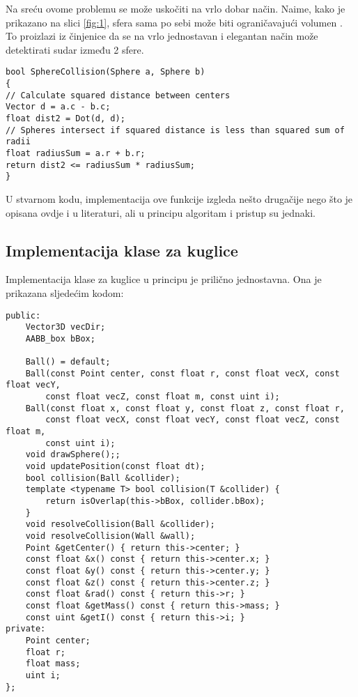 Na sreću ovome problemu se može uskočiti na vrlo dobar način. Naime, kako je prikazano na slici \ref{fig:1}, sfera sama po sebi može biti ograničavajući volumen \cite{1}. To proizlazi iz činjenice da se na vrlo jednostavan i elegantan način može detektirati sudar između 2 sfere. 

\begin{lstlisting}[style = {myC++},label={code:6-1}, caption = {Detekcija sudara između 2 sfere\cite{1}}]
bool SphereCollision(Sphere a, Sphere b)
{
// Calculate squared distance between centers
Vector d = a.c - b.c;
float dist2 = Dot(d, d);
// Spheres intersect if squared distance is less than squared sum of radii
float radiusSum = a.r + b.r;
return dist2 <= radiusSum * radiusSum;
}
\end{lstlisting}
U stvarnom kodu, implementacija ove funkcije izgleda nešto drugačije nego što je opisana ovdje i u literaturi, ali u principu algoritam i pristup su jednaki.
\newpage
\subsection{Implementacija klase za kuglice}

Implementacija klase za kuglice u principu je prilično jednostavna. Ona je prikazana sljedećim kodom:

\begin{lstlisting}[style = {myC++},label={code:7}, caption = {Implementacija klase za kuglice}]
public:
	Vector3D vecDir;
	AABB_box bBox;
	
	Ball() = default;
	Ball(const Point center, const float r, const float vecX, const float vecY,
		const float vecZ, const float m, const uint i);
	Ball(const float x, const float y, const float z, const float r,
		const float vecX, const float vecY, const float vecZ, const float m,
		const uint i);	
	void drawSphere();;
	void updatePosition(const float dt);
	bool collision(Ball &collider);
	template <typename T> bool collision(T &collider) {
		return isOverlap(this->bBox, collider.bBox);
	}
	void resolveCollision(Ball &collider);
	void resolveCollision(Wall &wall);
	Point &getCenter() { return this->center; }
	const float &x() const { return this->center.x; }
	const float &y() const { return this->center.y; }
	const float &z() const { return this->center.z; }
	const float &rad() const { return this->r; }
	const float &getMass() const { return this->mass; }
	const uint &getI() const { return this->i; }
private:
	Point center;
	float r;
	float mass;
	uint i;
};

\end{lstlisting}

